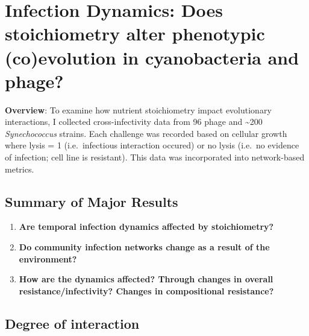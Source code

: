 \documentclass[]{article}
\providecommand{\tightlist}{%
  \setlength{\itemsep}{0pt}\setlength{\parskip}{0pt}}
\begin{document}
\newpage

\section{Infection Dynamics: Does stoichiometry alter phenotypic
(co)evolution in cyanobacteria and
phage?}\label{infection-dynamics-does-stoichiometry-alter-phenotypic-coevolution-in-cyanobacteria-and-phage}

\textbf{Overview}: To examine how nutrient stoichiometry impact
evolutionary interactions, I collected cross-infectivity data from 96
phage and \textasciitilde{}200 \emph{Synechococcus} strains. Each
challenge was recorded based on cellular growth where lysis = 1
(i.e.~infectious interaction occured) or no lysis (i.e.~no evidence of
infection; cell line is resistant). This data was incorporated into
network-based metrics.

\subsection{Summary of Major Results}\label{summary-of-major-results-2}

\begin{enumerate}
\def\labelenumi{\arabic{enumi}.}
\tightlist
\item
  \textbf{Are temporal infection dynamics affected by stoichiometry?}
\item
  \textbf{Do community infection networks change as a result of the
  environment?}
\item
  \textbf{How are the dynamics affected? Through changes in overall
  resistance/infectivity? Changes in compositional resistance?}
\end{enumerate}

\newpage

\subsection{Degree of interaction}\label{degree-of-interaction}
\end{document}
